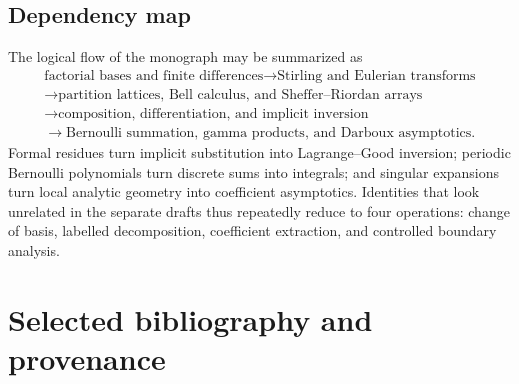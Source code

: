 \documentclass[11pt,a4paper,oneside,openany]{book}
\theoremstyle{definition}
\theoremstyle{remark}
\begin{document}
\section{Dependency map}
The logical flow of the monograph may be summarized as
\[
\begin{gathered}
 \text{factorial bases and finite differences}
 \longrightarrow \text{Stirling and Eulerian transforms}\\
 \longrightarrow \text{partition lattices, Bell calculus, and Sheffer--Riordan arrays}\\
 \longrightarrow \text{composition, differentiation, and implicit inversion}\\
 \longrightarrow \text{Bernoulli summation, gamma products, and Darboux asymptotics}.
\end{gathered}
\]
Formal residues turn implicit substitution into Lagrange--Good inversion; periodic
Bernoulli polynomials turn discrete sums into integrals; and singular expansions turn
local analytic geometry into coefficient asymptotics.  Identities that look unrelated
in the separate drafts thus repeatedly reduce to four operations: change of basis,
labelled decomposition, coefficient extraction, and controlled boundary analysis.

\backmatter

\chapter*{Selected bibliography and provenance}
\end{document}

